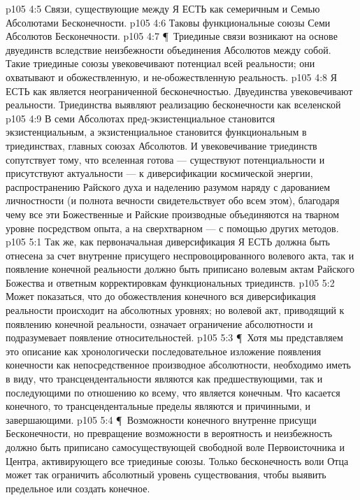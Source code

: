 \vs p105 4:5 \bibnobreakspace {} Связи, существующие между Я ЕСТЬ как семеричным и Семью Абсолютами Бесконечности.
\vs p105 4:6 \bibnobreakspace {} Таковы функциональные союзы Семи Абсолютов Бесконечности.
\vs p105 4:7 \P\ Триединые связи возникают на основе двуединств вследствие неизбежности объединения Абсолютов между собой. Такие триединые союзы увековечивают потенциал всей реальности; они охватывают и обожествленную, и не\hyp{}обожествленную реальность.
\vs p105 4:8 Я ЕСТЬ как  является неограниченной бесконечностью. Двуединства увековечивают  реальности. Триединства выявляют реализацию бесконечности как вселенской 
\vs p105 4:9 В семи Абсолютах пред\hyp{}экзистенциальное становится экзистенциальным, а экзистенциальное становится функциональным в триединствах, главных союзах Абсолютов. И увековечивание триединств сопутствует тому, что вселенная готова --- существуют потенциальности и присутствуют актуальности --- к диверсификации космической энергии, распространению Райского духа и наделению разумом наряду с дарованием личностности (и полнота вечности свидетельствует обо всем этом), благодаря чему все эти Божественные и Райские производные объединяются на тварном уровне посредством опыта, а на сверхтварном --- с помощью других методов.
\vs p105 5:1 Так же, как первоначальная диверсификация Я ЕСТЬ должна быть отнесена за счет внутренне присущего неспровоцированного волевого акта, так и появление конечной реальности должно быть приписано волевым актам Райского Божества и ответным корректировкам функциональных триединств.
\vs p105 5:2 Может показаться, что до обожествления конечного вся диверсификация реальности происходит на абсолютных уровнях; но волевой акт, приводящий к появлению конечной реальности, означает ограничение абсолютности и подразумевает появление относительностей.
\vs p105 5:3 \P\ Хотя мы представляем это описание как хронологически последовательное изложение появления конечности как непосредственное производное абсолютности, необходимо иметь в виду, что трансцендентальности являются как предшествующими, так и последующими по отношению ко всему, что является конечным. Что касается конечного, то трансцендентальные пределы являются и причинными, и завершающими.
\vs p105 5:4 \P\ Возможности конечного внутренне присущи Бесконечности, но превращение возможности в вероятность и неизбежность должно быть приписано самосуществующей свободной воле Первоисточника и Центра, активирующего все триединые союзы. Только бесконечность воли Отца может так ограничить абсолютный уровень существования, чтобы выявить предельное или создать конечное.
